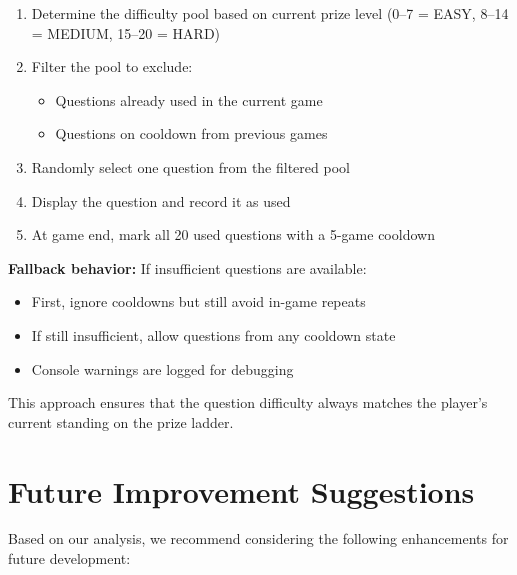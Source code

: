 \documentclass[11pt,a4paper]{article}
\begin{document}
\begin{enumerate}
    \item Determine the difficulty pool based on current prize level (0--7 = EASY, 8--14 = MEDIUM, 15--20 = HARD)
    \item Filter the pool to exclude:
        \begin{itemize}
            \item Questions already used in the current game
            \item Questions on cooldown from previous games
        \end{itemize}
    \item Randomly select one question from the filtered pool
    \item Display the question and record it as used
    \item At game end, mark all 20 used questions with a 5-game cooldown
\end{enumerate}

\textbf{Fallback behavior:} If insufficient questions are available:
\begin{itemize}
    \item First, ignore cooldowns but still avoid in-game repeats
    \item If still insufficient, allow questions from any cooldown state
    \item Console warnings are logged for debugging
\end{itemize}

This approach ensures that the question difficulty always matches the player's current standing on the prize ladder.

\section{Future Improvement Suggestions}

Based on our analysis, we recommend considering the following enhancements for future development:
\end{document}
